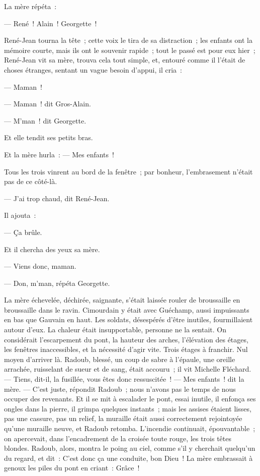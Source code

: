\documentclass[french,twoside]{book} %
\begin{document}
La mère répéta :\par
— René ! Alain ! Georgette !\par
René-Jean tourna la tête ; cette voix le tira de sa distraction ; les enfants ont la mémoire courte, mais ils ont le souvenir rapide ; tout le passé est pour eux hier ; René-Jean vit sa mère, trouva cela tout simple, et, entouré comme il l’était de choses étranges, sentant un vague besoin d’appui, il cria :\par
— Maman !\par
— Maman ! dit Gros-Alain.\par
— M’man ! dit Georgette.\par
 Et elle tendit ses petits bras.\par
Et la mère hurla : — Mes enfants !\par
Tous les trois vinrent au bord de la fenêtre ; par bonheur, l’embrasement n’était pas de ce côté-là.\par
— J’ai trop chaud, dit René-Jean.\par
Il ajouta :\par
— Ça brûle.\par
Et il chercha des yeux sa mère.\par
— Viens donc, maman.\par
— Don, m’man, répéta Georgette.\par
La mère échevelée, déchirée, saignante, s’était laissée rouler de broussaille en broussaille dans le ravin. Cimourdain y était avec Guéchamp, aussi impuissants en bas que Gauvain en haut. Les soldats, désespérés d’être inutiles, fourmillaient autour d’eux. La chaleur était insupportable, personne ne la sentait. On considérait l’escarpement du pont, la hauteur des arches, l’élévation des étages, les fenêtres inaccessibles, et la nécessité d’agir vite. Trois étages à franchir. Nul moyen d’arriver là. Radoub, blessé, un coup de sabre à l’épaule, une oreille arrachée, ruisselant de sueur et de sang, était accouru ; il vit Michelle Fléchard. — Tiens, dit-il, la fusillée, vous êtes donc ressuscitée ! — Mes enfants ! dit la mère. — C’est juste, répondit Radoub ; nous n’avons pas le temps de nous occuper des revenants. Et il se mit à escalader le pont, essai inutile, il enfonça ses ongles dans la pierre, il grimpa quelques instants ; mais les assises étaient lisses, pas une cassure, pas un relief, la muraille était aussi correctement rejointoyée qu’une muraille neuve, et  Radoub retomba. L’incendie continuait, épouvantable ; on apercevait, dans l’encadrement de la croisée toute rouge, les trois têtes blondes. Radoub, alors, montra le poing au ciel, comme s’il y cherchait quelqu’un du regard, et dit : C’est donc ça une conduite, bon Dieu ! La mère embrassait à genoux les piles du pont en criant : Grâce !\par
\end{document}
